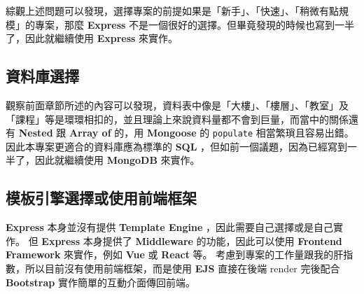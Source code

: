 \documentclass{article}
\begin{document}
綜觀上述問題可以發現，選擇專案的前提如果是「新手」、「快速」、「稍微有點規模」的專案，那麼 \textbf{Express} 不是一個很好的選擇。但畢竟發現的時候也寫到一半了，因此就繼續使用 \textbf{Express} 來實作。

\subsection{資料庫選擇}

觀察前面章節所述的內容可以發現，資料表中像是「大樓」、「樓層」、「教室」及「課程」等是環環相扣的，並且理論上來說資料量都不會到巨量，而當中的關係還有 \textbf{Nested} 跟 \textbf{Array of} 的，用 \textbf{Mongoose} 的 \verb|populate| 相當繁瑣且容易出錯。
因此本專案更適合的資料庫應為標準的 \textbf{SQL} ，但如前一個議題，因為已經寫到一半了，因此就繼續使用 \textbf{MongoDB} 來實作。

\subsection{模板引擎選擇或使用前端框架}

\textbf{Express} 本身並沒有提供 \textbf{Template Engine} ，因此需要自己選擇或是自己實作。
但 \textbf{Express} 本身提供了 \textbf{Middleware} 的功能，因此可以使用 \textbf{Frontend Framework} 來實作，例如 \textbf{Vue} 或 \textbf{React} 等。
考慮到專案的工作量跟我的肝指數，所以目前沒有使用前端框架，而是使用 \textbf{EJS} 直接在後端 render 完後配合 \textbf{Bootstrap} 實作簡單的互動介面傳回前端。
\end{document}
